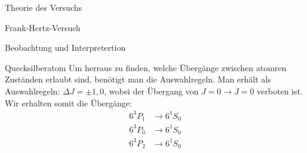 \documentclass[pdftex, a4paper,11pt, twoside, ngerman]{report}
\begin{document}
\begin{chapter}{Theorie des Versuchs}
\begin{section}{Frank-Hertz-Versuch}
\begin{subsection}{Beobachtung und Interpretertion}
        \end{subsection}
        \begin{subsection}{Quecksilberatom}
            Um herraus zu finden, welche Übergänge zwischen atomren Zuständen erlaubt sind, benötigt man die Auswahlregeln.
            Man erhält als Auswahlregeln: $\Delta J = \pm 1,0$, wobei der Übergang von $J=0 \rightarrow J=0$ verboten ist.
            Wir erhalten somit die Übergänge:
            \begin{align*}
                6^3P_1 &\rightarrow 6^1S_0 \\
                6^3P_0 &\rightarrow 6^1S_0 \\
                6^3P_2 &\rightarrow 6^1S_0 \\
            \end{align*}


        \end{subsection}

    

    \end{section}
    
  \end{chapter}
         
         
         
\end{document}
